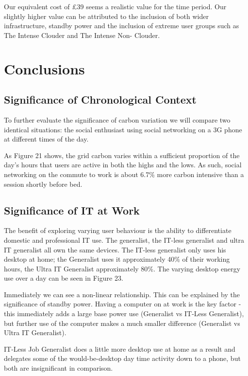 \documentclass[conference]{IEEEtran}
\begin{document}
Our equivalent cost of \pounds 39 seems a realistic value for the time
period.  Our slightly higher value can be attributed to the inclusion
of both wider infrastructure, standby power and the inclusion of
extreme user groups such as The Intense Clouder and The Intense Non-
Clouder.


\section{Conclusions}

\subsection{Significance of Chronological Context}

To further evaluate the significance of carbon variation we will
compare two identical situations: the social enthusiast using social
networking on a 3G phone at different times of the day.

As Figure 21 shows, the grid carbon varies within a sufficient
proportion of the day’s hours that users are active in both the highs
and the lows. As such, social networking on the commute to work is
about 6.7\% more carbon intensive than a session shortly before bed.

\subsection{Significance of IT at Work}

The benefit of exploring varying user behaviour is the ability to
differentiate domestic and professional IT use. The generalist, the
IT-less generalist and ultra IT generalist all own the same
devices. The IT-less generalist only uses his desktop at home; the
Generalist uses it approximately 40\% of their working hours, the
Ultra IT Generalist approximately 80\%. The varying desktop energy use
over a day can be seen in Figure 23.

Immediately we can see a non-linear relationship. This can be
explained by the significance of standby power. Having a computer on
at work is the key factor - this immediately adds a large base power
use (Generalist vs IT-Less Generalist), but further use of the
computer makes a much smaller difference (Generalist vs Ultra IT
Generalist).

IT-Less Job Generalist does a little more desktop use at home as a
result and delegates some of the would-be-desktop day time activity
down to a phone, but both are insignificant in comparison.
\end{document}
